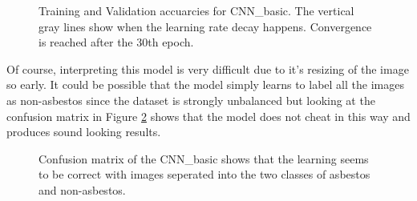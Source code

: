 \begin{figure}[h]
\centering
{}
\caption{Training and Validation accuarcies for CNN\_basic. The vertical gray lines show when the learning rate decay happens. Convergence is reached after the 30th epoch.}
\label{fig:cnn-basic}
\end{figure}


Of course, interpreting this model is very difficult due to it's resizing of the image so early. It could be possible that the model simply learns to label all the images as non-asbestos since the dataset is strongly unbalanced but looking at the confusion matrix in Figure \ref{fig:cnn-basic-cm} shows that the model does not cheat in this way and produces sound looking results.

\begin{figure}[h]
\centering
{}
\caption{Confusion matrix of the CNN\_basic shows that the learning seems to be correct with images seperated into the two classes of asbestos and non-asbestos.}
\label{fig:cnn-basic-cm}
\end{figure}

